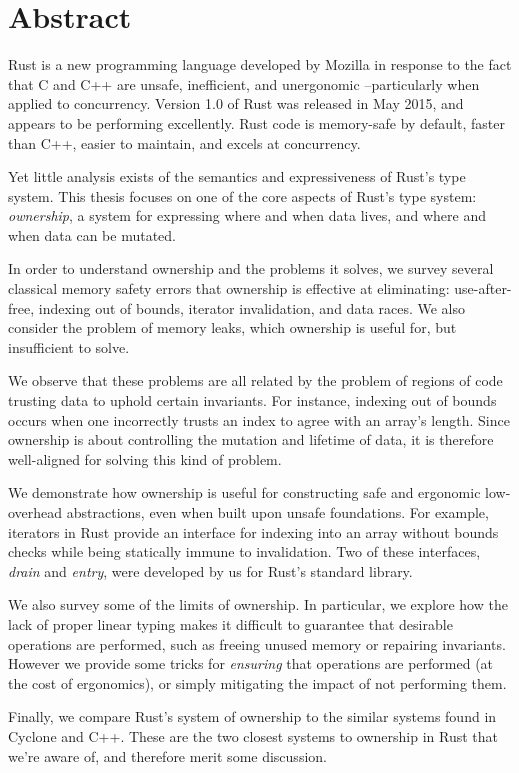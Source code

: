 {}
\begingroup
\let\clearpage\relax
\let\cleardoublepage\relax
\let\cleardoublepage\relax

\chapter*{Abstract}
Rust is a new programming language developed by Mozilla in response to the fact
that C and C++ are unsafe, inefficient, and unergonomic --particularly when
applied to concurrency. Version 1.0 of Rust was released in May 2015, and appears
to be performing excellently. Rust code is memory-safe
by default, faster than C++, easier to maintain, and excels at concurrency.

Yet little analysis exists of the semantics and expressiveness of Rust's type
system. This thesis focuses on one of the core aspects of Rust's type system:
\emph{ownership}, a system for expressing where and when data lives, and
where and when data can be mutated.

In order to understand ownership and the problems it solves, we survey
several classical memory safety errors that ownership is effective at eliminating:
use-after-free, indexing out of bounds, iterator invalidation, and data races.
We also consider the problem of memory leaks, which ownership is useful for,
but insufficient to solve.

We observe that these problems are all related by the problem of regions of
code trusting data to uphold certain invariants. For instance, indexing out
of bounds occurs when one incorrectly trusts an index to agree with an array's
length. Since ownership is about controlling the mutation and lifetime of data,
it is therefore well-aligned for solving this kind of problem.

We demonstrate how ownership is useful for constructing safe and ergonomic
low-overhead abstractions, even when built upon unsafe foundations. For example,
iterators in Rust provide an interface for indexing into an array
without bounds checks while being statically immune to invalidation.
Two of these interfaces, \emph{drain} and \emph{entry}, were developed by us for Rust's
standard library.

We also survey some of the limits of ownership. In particular, we
explore how the lack of proper linear typing makes it difficult to guarantee
that desirable operations are performed, such as freeing unused memory or
repairing invariants. However we provide some tricks for \emph{ensuring} that operations
are performed (at the cost of ergonomics), or simply mitigating the impact of not
performing them.

Finally, we compare Rust's system of ownership to the similar systems found in
Cyclone and C++. These are the two closest systems to ownership in Rust
that we're aware of, and therefore merit some discussion.

\endgroup

\vfill

